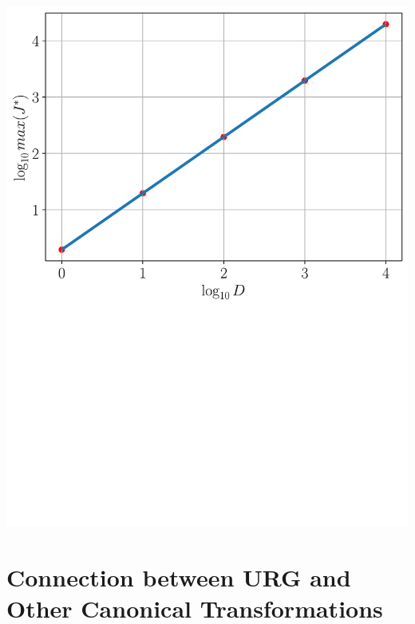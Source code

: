 \documentclass[twoside,11pt]{report}
\numberwithin{equation}{section}
\begin{document}
\begin{center}
	\includegraphics[scale=0.5]{../figures/JvsD_kondo.pdf}
	\label{JvsD-kondo}
\end{center}

\chapter{Connection between URG and Other Canonical Transformations}
\label{urg_canonical}
\end{document}
